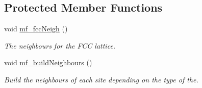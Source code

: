 \subsection*{Protected Member Functions}
\begin{DoxyCompactItemize}
\item 
\mbox{\label{classLattice_a0f932c1ad96eaaa2dcee0cec3da16c2a}} 
void \mbox{\hyperlink{classLattice_a0f932c1ad96eaaa2dcee0cec3da16c2a}{mf\+\_\+fcc\+Neigh}} ()
\begin{DoxyCompactList}\small\item\em The neighbours for the F\+CC lattice. \end{DoxyCompactList}\item 
\mbox{\label{classLattice_a70f6567232ec6739b19afecb5ef7f79c}} 
void \mbox{\hyperlink{classLattice_a70f6567232ec6739b19afecb5ef7f79c}{mf\+\_\+build\+Neighbours}} ()
\begin{DoxyCompactList}\small\item\em Build the neighbours of each site depending on the type of the. \end{DoxyCompactList}\end{DoxyCompactItemize}
